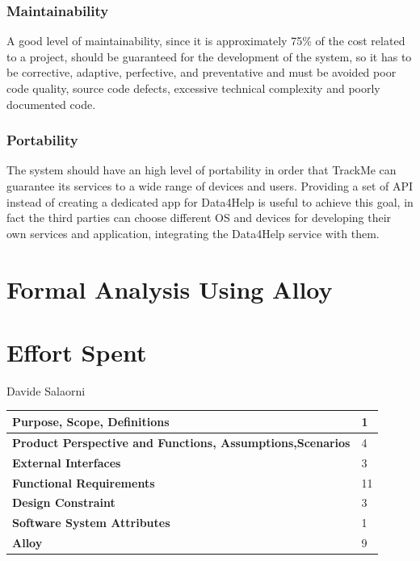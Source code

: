 \documentclass[a4paper]{article}
\begin{document}
\vspace{0.5cm}

\subsubsection{Maintainability}

A good level of maintainability, since it is approximately 75\% of the cost related to a project, should be guaranteed for the development of the system, so it has to be corrective, adaptive, perfective, and preventative and
must be avoided poor code quality, source code defects, excessive technical complexity and poorly documented code.

\vspace{0.5cm}

\subsubsection{Portability}

The system should have an high level of portability in order that TrackMe can guarantee its services to a wide range of devices and users.
Providing a set of API instead of creating a dedicated app for Data4Help is useful to achieve this goal, in fact the third parties can choose different OS and devices for developing their own services and application, integrating the Data4Help service with them.
\clearpage

\section{Formal Analysis Using Alloy}
    
    \section{Effort Spent}
    
    Davide Salaorni
    
    \begin{center}
    \begin{tabular}{|l | l |}
        \hline \bf{Purpose, Scope, Definitions} & 1 \\ \hline
        \bf{Product Perspective and Functions, Assumptions,Scenarios}  & 4 \\ \hline
        \bf{External Interfaces} & 3 \\ \hline
        \bf{Functional Requirements} & 11 \\ \hline
        \bf{Design Constraint} & 3\\ \hline
        \bf{Software System Attributes} & 1 \\ \hline
        \bf{Alloy} & 9 \\ \hline
    \end{tabular}
\end{center}
\end{document}

